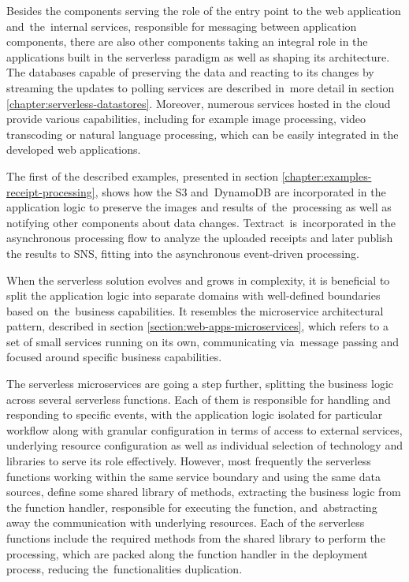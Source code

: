 Besides the components serving the role of the entry point to the web application and~the~internal services, responsible for messaging between application components, there are also other components taking an integral role in the applications built in the serverless paradigm as well as shaping its architecture.
The databases capable of preserving the data and reacting to its changes by streaming the updates to polling services are described in~more detail in section \ref{chapter:serverless-datastores}.
Moreover, numerous services hosted in the cloud provide various capabilities, including for example image processing, video transcoding or natural language processing, which can be easily integrated in the developed web applications.

The first of the described examples, presented in section \ref{chapter:examples-receipt-processing}, shows how the S3 and~DynamoDB are incorporated in the application logic to preserve the images and results of~the~processing as well as notifying other components about data changes.
Textract~is~incorporated in the asynchronous processing flow to analyze the uploaded receipts and later publish the results to SNS, fitting into the asynchronous event-driven processing.

When the serverless solution evolves and grows in complexity, it is beneficial to split the application logic into separate domains with well-defined boundaries based on~the~business capabilities.
It resembles the microservice architectural pattern, described in section \ref{section:web-apps-microservices}, which refers to a set of small services running on its own, communicating via~message passing and focused around specific business capabilities.

The serverless microservices are going a step further, splitting the business logic across several serverless functions.
Each of them is responsible for handling and responding to specific events, with the application logic isolated for particular workflow along with granular configuration in terms of access to external services, underlying resource configuration as well as individual selection of technology and libraries to serve its role effectively.
However, most frequently the serverless functions working within the same service boundary and using the same data sources, define some shared library of methods, extracting the business logic from the function handler, responsible for executing the function, and~abstracting away the communication with underlying resources.
Each of the serverless functions include the required methods from the shared library to perform the processing, which are packed along the function handler in the deployment process, reducing the~functionalities duplication.

